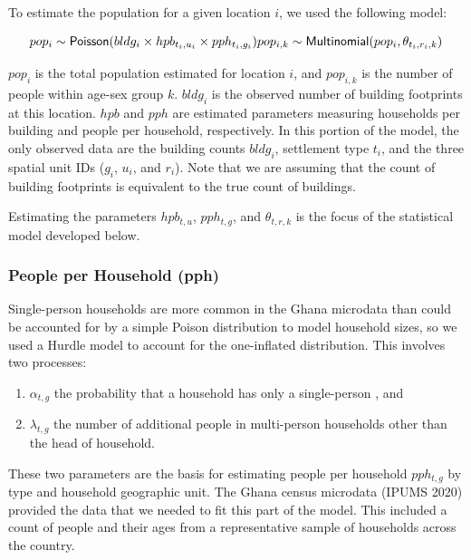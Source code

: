 \documentclass[]{book}
\begin{document}
To estimate the population for a given location \(i\), we used the
following model:

\begin{equation}
pop_i \sim \textsf{Poisson}(bldg_i \times hpb_{t_i,u_i} \times pph_{t_i, g_i}) \\
pop_{i,k} \sim \textsf{Multinomial}(pop_i, \theta_{t_i,r_i,k})
\label{eq:predict}
\end{equation}

\(pop_i\) is the total population estimated for location \(i\), and
\(pop_{i,k}\) is the number of people within age-sex group \(k\).
\(bldg_i\) is the observed number of building footprints at this
location. \(hpb\) and \(pph\) are estimated parameters measuring
households per building and people per household, respectively. In this
portion of the model, the only observed data are the building counts
\(bldg_i\), settlement type \(t_i\), and the three spatial unit IDs
(\(g_i\), \(u_i\), and \(r_i\)). Note that we are assuming that the
count of building footprints is equivalent to the true count of
buildings.

Estimating the parameters \(hpb_{t,u}\), \(pph_{t,g}\), and
\(\theta_{t,r,k}\) is the focus of the statistical model developed
below.

\subsubsection*{People per Household
(pph)}\label{people-per-household-pph}

Single-person households are more common in the Ghana microdata than
could be accounted for by a simple Poison distribution to model
household sizes, so we used a Hurdle model \citep{stan2019stan} to
account for the one-inflated distribution. This involves two processes:

\begin{enumerate}
\def\labelenumi{\arabic{enumi}.}
\item
  \(\alpha_{t,g}\) the probability that a household has only a
  single-person , and
\item
  \(\lambda_{t,g}\) the number of additional people in multi-person
  households other than the head of household.
\end{enumerate}

These two parameters are the basis for estimating people per household
\(pph_{t,g}\) by type and household geographic unit. The Ghana census
microdata (IPUMS 2020) provided the data that we needed to fit this part
of the model. This included a count of people and their ages from a
representative sample of households across the country.
\end{document}
